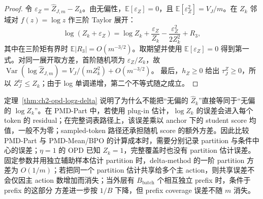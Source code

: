 \begin{proof}
令 $\varepsilon_Z=\widehat Z_{J,m}-Z_k$。由无偏性，$\mathbb E[\varepsilon_Z]=0$，且 $\mathbb E[\varepsilon_Z^2]=V_J/m$。在 $Z_k$ 邻域对 $f(z)=\log z$ 作三阶 Taylor 展开：
\begin{equation}
\log(Z_k+\varepsilon_Z)=\log Z_k+\frac{\varepsilon_Z}{Z_k}
 -\frac{\varepsilon_Z^2}{2Z_k^2}+R_3,
\end{equation}
其中在三阶矩有界时 $\mathbb E|R_3|=O(m^{-3/2})$。取期望并使用 $\mathbb E[\varepsilon_Z]=0$ 得到第一式。对同一展开取方差，首阶随机项为 $\varepsilon_Z/Z_k$，故 $\operatorname{Var}(\log\widehat Z_{J,m})=V_J/(mZ_k^2)+O(m^{-3/2})$。 最后，$h_Z\ge0$ 给出 $\tau_J^Z\ge0$，所以 $Z_J^{\mathrm{tr}}\le Z_k$；由于 log 单调递增，第二个不等式随之成立。
\end{proof}

定理~\ref{thm:ch2-opd-logz-delta} 说明了为什么不能把“无偏的 $\widehat Z_k$”直接等同于“无偏的 $\log Z_k$”。在 PMD-Part 中，若使用 plug-in 估计，$\log Z_k$ 的误差会进入每个 token 的 residual；在完整词表路径上，该误差乘以 anchor 下的 student score 均值，一般不为零；sampled-token 路径还承担随机 score 的额外方差。因此比较 PMD-Part 与 PMD-Mean/BPO 的计算成本时，需要分别记录 partition 与条件中心的误差；$\eta=1$ 的 OPD 已知 $Z_k=1$，完整覆盖时也没有 partition 估计误差。 固定参数并用独立辅助样本估计 partition 时，delta-method 的一阶 partition 方差为 $O(1/m)$；若把同一个 partition 估计共享给多个主 action，则共享误差不会仅因主 action 数增加而消失；当外层有 $B_{\mathrm{batch}}$ 个相互独立 prefix 时，条件于 prefix 的这部分 方差进一步按 $1/B$ 下降，但 prefix coverage 误差不随 $m$ 消失。

